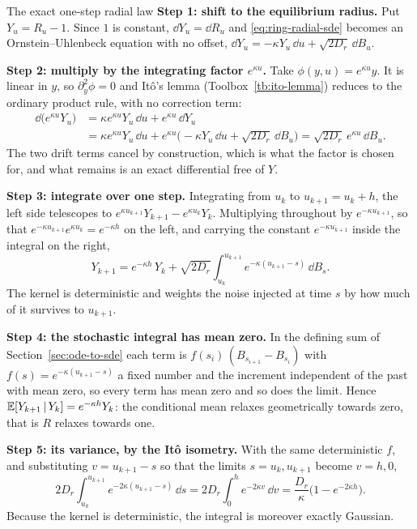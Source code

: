 \begin{toolbox}{The exact one-step radial law}
\textbf{Step 1: shift to the equilibrium radius.} Put $Y_u = R_u - 1$. Since
$1$ is constant, $\dd Y_u = \dd R_u$ and \eqref{eq:ring-radial-sde} becomes an
Ornstein--Uhlenbeck equation with no offset,
$\dd Y_u = -\kappa Y_u\,\dd u + \sqrt{2D_r}\,\dd B_u$.

\textbf{Step 2: multiply by the integrating factor $e^{\kappa u}$.} Take
$\phi(y,u) = e^{\kappa u}y$. It is linear in $y$, so
$\partial^2_y \phi = 0$ and It\^o's lemma (Toolbox~\ref{tb:ito-lemma}) reduces to the
ordinary product rule, with no correction term:
\begin{align*}
  \dd\big(e^{\kappa u} Y_u\big)
  &= \kappa e^{\kappa u} Y_u\,\dd u + e^{\kappa u}\,\dd Y_u \\
  &= \kappa e^{\kappa u} Y_u\,\dd u
     + e^{\kappa u}\big(-\kappa Y_u\,\dd u + \sqrt{2D_r}\,\dd B_u\big)
   = \sqrt{2D_r}\, e^{\kappa u}\, \dd B_u .
\end{align*}
The two drift terms cancel by construction, which is what the factor is chosen
for, and what remains is an exact differential free of $Y$.

\textbf{Step 3: integrate over one step.} Integrating from $u_k$ to
$u_{k+1} = u_k + h$, the left side telescopes to
$e^{\kappa u_{k+1}}Y_{k+1} - e^{\kappa u_k}Y_k$. Multiplying throughout by
$e^{-\kappa u_{k+1}}$, so that
$e^{-\kappa u_{k+1}}e^{\kappa u_k} = e^{-\kappa h}$ on the left, and carrying
the constant $e^{-\kappa u_{k+1}}$ inside the integral on the right,
\begin{equation}
  Y_{k+1} = e^{-\kappa h}\, Y_k
    + \sqrt{2D_r} \int_{u_k}^{u_{k+1}}
      e^{-\kappa(u_{k+1}-s)}\, \dd B_s .
  \label{eq:ring-radial-solution}
\end{equation}
The kernel is deterministic and weights the noise injected at time $s$ by how
much of it survives to $u_{k+1}$.

\textbf{Step 4: the stochastic integral has mean zero.} In the defining sum of
Section~\ref{sec:ode-to-sde} each term is
$f(s_i)\,(B_{s_{i+1}} - B_{s_i})$ with $f(s) = e^{-\kappa(u_{k+1}-s)}$ a fixed
number and the increment independent of the past with mean zero, so every term
has mean zero and so does the limit. Hence
$\mathbb{E}[Y_{k+1}\,|\,Y_k] = e^{-\kappa h}Y_k$: the conditional mean relaxes
geometrically towards zero, that is $R$ relaxes towards one.

\textbf{Step 5: its variance, by the It\^o isometry.} With the same
deterministic $f$, and substituting $v = u_{k+1}-s$ so that the limits
$s = u_k, u_{k+1}$ become $v = h, 0$,
\begin{equation}
  2D_r \int_{u_k}^{u_{k+1}} e^{-2\kappa(u_{k+1}-s)}\,\dd s
  = 2D_r \int_0^h e^{-2\kappa v}\,\dd v
  = \frac{D_r}{\kappa}\big(1 - e^{-2\kappa h}\big) .
  \label{eq:ring-radial-variance}
\end{equation}
Because the kernel is deterministic, the integral is moreover exactly Gaussian.


\end{toolbox}
